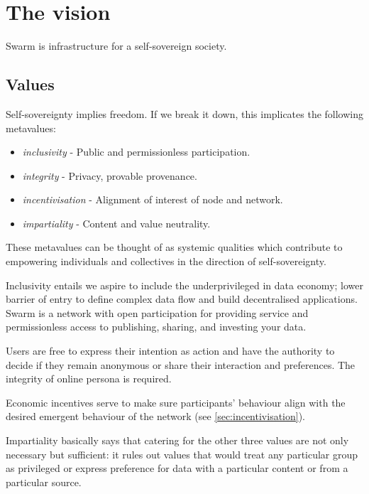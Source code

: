 \section{The vision  \statusorange}\label{sec:vision}


\begin{displayquote}
Swarm is infrastructure for a self-sovereign society. 
\end{displayquote}


\subsection{Values \statusorange}\label{sec:values}

Self-sovereignty implies freedom. If we break it down, this implicates the following metavalues: 

\begin{itemize}
\item \emph{inclusivity} - Public and permissionless participation.  
\item \emph{integrity} - Privacy, provable provenance. 
\item \emph{incentivisation} - Alignment of interest of node and network.
\item \emph{impartiality} -  Content and value neutrality.  
\end{itemize}

These metavalues can be thought of as systemic qualities which contribute to empowering individuals and collectives in the direction of self-sovereignty.

Inclusivity entails we aspire to include the underprivileged in data economy; lower barrier of entry to define complex data flow and build decentralised applications. Swarm is a network with open participation for providing service and permissionless access to publishing, sharing, and investing your data.

Users are free to express their intention as action and have the authority to decide if they remain anonymous or share their interaction and preferences. The integrity of online persona is required. 

Economic incentives serve to make sure participants' behaviour align with the desired emergent behaviour of the network (see \ref{sec:incentivisation}). 

Impartiality basically says that catering for the other three values are not only necessary but sufficient: it rules out values that would treat any particular group as privileged or express preference for data with a particular content or from a particular source.

